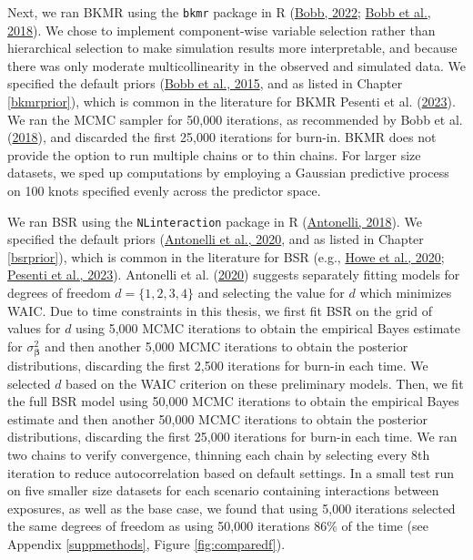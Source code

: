 \documentclass[12pt, twoside]{amherstthesis}
\begin{document}
Next, we ran BKMR using the \texttt{bkmr} package in R (\protect\hyperlink{ref-bobb_bkmr_2022}{Bobb, 2022}; \protect\hyperlink{ref-bobb_statistical_2018}{Bobb et al., 2018}). We chose to implement component-wise variable selection rather than hierarchical selection to make simulation results more interpretable, and because there was only moderate multicollinearity in the observed and simulated data. We specified the default priors (\protect\hyperlink{ref-bobb_bayesian_2015}{Bobb et al., 2015}, and as listed in Chapter \ref{bkmrprior}), which is common in the literature for BKMR Pesenti et al. (\protect\hyperlink{ref-pesenti_comparative_2023}{2023}). We ran the MCMC sampler for 50,000 iterations, as recommended by Bobb et al. (\protect\hyperlink{ref-bobb_statistical_2018}{2018}), and discarded the first 25,000 iterations for burn-in. BKMR does not provide the option to run multiple chains or to thin chains. For larger size datasets, we sped up computations by employing a Gaussian predictive process on 100 knots specified evenly across the predictor space.

We ran BSR using the \texttt{NLinteraction} package in R (\protect\hyperlink{ref-antonelli_nlinteraction_2018}{Antonelli, 2018}). We specified the default priors (\protect\hyperlink{ref-antonelli_estimating_2020}{Antonelli et al., 2020}, and as listed in Chapter \ref{bsrprior}), which is common in the literature for BSR (e.g., \protect\hyperlink{ref-howe_prenatal_2020}{Howe et al., 2020}; \protect\hyperlink{ref-pesenti_comparative_2023}{Pesenti et al., 2023}). Antonelli et al. (\protect\hyperlink{ref-antonelli_estimating_2020}{2020}) suggests separately fitting models for degrees of freedom \(d=\{1, 2, 3, 4\}\) and selecting the value for \(d\) which minimizes WAIC. Due to time constraints in this thesis, we first fit BSR on the grid of values for \(d\) using 5,000 MCMC iterations to obtain the empirical Bayes estimate for \(\sigma^2_{\boldsymbol\beta}\) and then another 5,000 MCMC iterations to obtain the posterior distributions, discarding the first 2,500 iterations for burn-in each time. We selected \(d\) based on the WAIC criterion on these preliminary models. Then, we fit the full BSR model using 50,000 MCMC iterations to obtain the empirical Bayes estimate and then another 50,000 MCMC iterations to obtain the posterior distributions, discarding the first 25,000 iterations for burn-in each time. We ran two chains to verify convergence, thinning each chain by selecting every 8th iteration to reduce autocorrelation based on default settings. In a small test run on five smaller size datasets for each scenario containing interactions between exposures, as well as the base case, we found that using 5,000 iterations selected the same degrees of freedom as using 50,000 iterations 86\% of the time (see Appendix \ref{suppmethods}, Figure \ref{fig:comparedf}).
\end{document}

